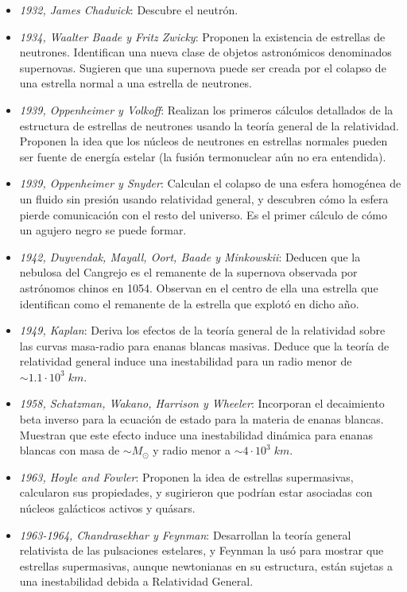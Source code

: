 \begin{itemize}
\item \emph{1932, James Chadwick}: Descubre el neutrón.
\item \emph{1934, Waalter Baade y Fritz Zwicky}: Proponen la existencia de estrellas de neutrones. Identifican una nueva clase de objetos astronómicos denominados supernovas. Sugieren que una supernova puede ser creada por el colapso de una estrella normal a una estrella de neutrones.
\item \emph{1939, Oppenheimer y Volkoff}: Realizan los primeros cálculos detallados de la estructura de estrellas de neutrones usando la teoría general de la relatividad. Proponen la idea que los núcleos de neutrones en estrellas normales pueden ser fuente de energía estelar (la fusión termonuclear aún no era entendida).
\item \emph{1939, Oppenheimer y Snyder}: Calculan el colapso de una esfera homogénea de un fluido sin presión usando relatividad general, y descubren cómo la esfera pierde comunicación con el resto del universo. Es el primer cálculo de cómo un agujero negro se puede formar.
\item \emph{1942, Duyvendak, Mayall, Oort, Baade y Minkowskii}: Deducen que la nebulosa del Cangrejo es el remanente de la supernova observada por astrónomos chinos en 1054. Observan en el centro de ella una estrella que identifican como el remanente de la estrella que explotó en dicho año.
\item \emph{1949, Kaplan}: Deriva los efectos de la teoría general de la relatividad sobre las curvas masa-radio para enanas blancas masivas. Deduce que la teoría de relatividad general induce una inestabilidad para un radio menor de $\sim1.1\cdot10^{3}\;km$.
\item \emph{1958, Schatzman, Wakano, Harrison y Wheeler}: Incorporan el decaimiento beta inverso para la ecuación de estado para la materia de enanas blancas. Muestran que este efecto induce una inestabilidad dinámica para enanas blancas con masa de $\sim M_{\odot}$ y radio menor a $\sim4\cdot10^{3}\;km$.
\item \emph{1963, Hoyle and Fowler}: Proponen la idea de estrellas supermasivas, calcularon sus propiedades, y sugirieron que podrían estar asociadas con núcleos galácticos activos y quásars.
\item \emph{1963-1964, Chandrasekhar y Feynman}: Desarrollan la teoría general relativista de las pulsaciones estelares, y Feynman la usó para mostrar que estrellas supermasivas, aunque newtonianas en su estructura, están sujetas a una inestabilidad debida a Relatividad General.

\end{itemize}
